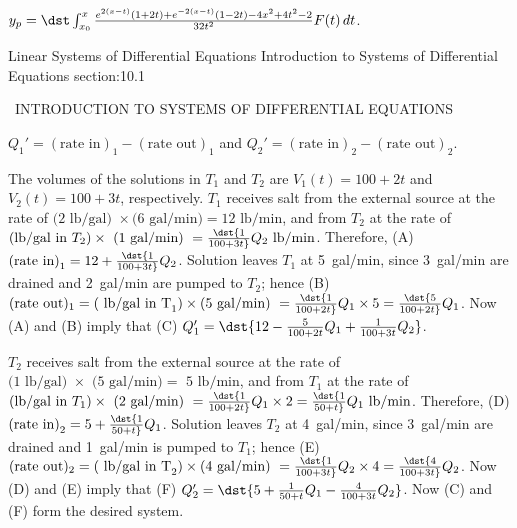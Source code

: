 \documentclass[dvips]{book}
\renewcommand{\exer}[1]{\par\medskip\;\noindent{\color{red}\bf #1.}}
\numberwithin{example}{section}
\numberwithin{equation}{section}
\numberwithin{theorem}{section}
\numberwithin{table}{section}
\numberwithin{figure}{section}
\begin{document}
$y_p=\dst\int_{x_0}^x
{e^{2(x-t)}(1+2t)+e^{-2(x-t)}(1-2t)-4x^2+4t^2-2\over32t^2}
F(t)\,dt$.


\newpage
\thispagestyle{empty}
\mbox{}
\newpage
\thispagestyle{empty}

\setcounter{chapter}{10}



 {Linear Systems of Differential Equations}
{Introduction to Systems of Differential Equations}
 {section:10.1}




\renewcommand{\thissection}{\sectiontitle
{\, INTRODUCTION TO SYSTEMS OF DIFFERENTIAL EQUATIONS }}
\thissection

\vspace*{-17.5pt}


\exer{10.1.2}
$Q_1'=(\mbox{rate in})_1-(\mbox{rate out})_1$ and $Q_2'=(\mbox{rate
in})_2-(\mbox{rate out})_2$.

The volumes of the solutions in $T_1$ and $T_2$ are $V_1(t)=100+2t$
and $V_2(t)=100+3t$, respectively. $T_1$ receives salt from the
external source at the rate of $\mbox{(2 lb/gal) }\times\mbox{
(6~gal/min)}=\mbox{12 lb/min}$, and from $T_2$ at the rate of
$\mbox{(lb/gal in }T_2)\times\mbox{ (1~gal/min)
}=\dst{1\over100+3t}Q_2 \mbox{ lb/min}$. Therefore, (A) $\mbox{(rate
in)}_1= 12+\dst{1\over100+3t}Q_2$. Solution leaves $T_1$ at 5~gal/min,
since 3~gal/min are drained and 2~gal/min are pumped to $T_2$; hence
(B) $(\mbox{rate out})_1=(\mbox{ lb/gal in T}_1)\times
\mbox{(5~gal/min) }
=\dst{1\over100+2t}Q_1\times5=\dst{5\over100+2t}Q_1$. Now (A) and (B)
imply that (C) $Q_1'=\dst{12-{5\over100+2t}Q_1+{1\over100+3t}Q_2}$.

$T_2$ receives salt from the external source at the rate of $\mbox{(1
lb/gal) }\times\mbox{ (5~gal/min)}=\mbox{ 5 lb/min}$, and from $T_1$
at the rate of $\mbox{(lb/gal in }T_1)\times\mbox{ (2~gal/min)
}=\dst{1\over100+2t}Q_1\times2=\dst{1\over50+t}Q_1 \mbox{ lb/min}$.
Therefore, (D) $\mbox{(rate in)}_2= 5+\dst{1\over50+t}Q_1$. Solution
leaves $T_2$ at 4~gal/min, since 3~gal/min are drained and 1~gal/min
is pumped to $T_1$; hence (E) $(\mbox{rate out})_2=(\mbox{ lb/gal in
T}_2)\times \mbox{(4~gal/min) }
=\dst{1\over100+3t}Q_2\times4=\dst{4\over100+3t}Q_2$. Now (D) and (E)
imply that (F) $Q_2'=\dst{5+{1\over50+t}Q_1-{4\over100+3t}Q_2}$. Now
(C) and (F) form the desired system.
\end{document}

